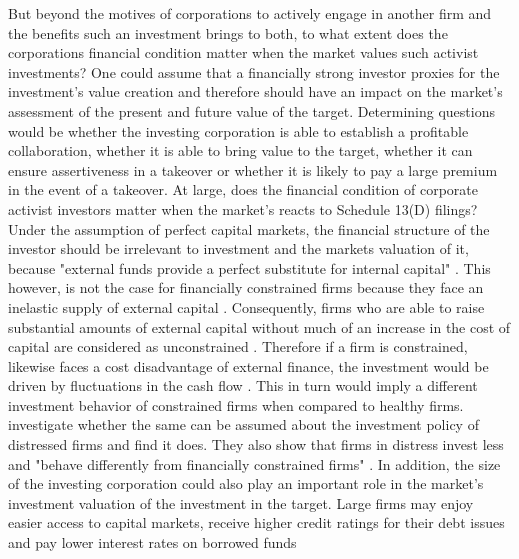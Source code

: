 \documentclass[12pt]{article}
\begin{document}
But beyond the motives of corporations to actively engage in another firm and the benefits such an investment brings to both, to what extent does the corporations financial condition matter when the market values such activist investments?  One could assume that a financially strong investor proxies for the investment's value creation and therefore should have an impact on the market's assessment of the present and future value of the target. Determining questions would be whether the investing corporation is able to establish a profitable collaboration, whether it is able to bring value to the target, whether it can ensure assertiveness in a takeover or whether it is likely to pay a large premium in the event of a takeover. At large, does the financial condition of corporate activist investors matter when the market's reacts to Schedule 13(D) filings?\\
Under the assumption of perfect capital markets, the financial structure of the investor should be irrelevant to investment and the markets valuation of it, because "external funds provide a perfect substitute for internal capital" \citep[p. 141]{Fazzari2016}. This however, is not the case for financially constrained firms because they face an inelastic supply of external capital \citep[p.1]{Farre-mensa2013}. Consequently, firms who are able to raise substantial amounts of external capital without much of an increase in the cost of capital are considered as unconstrained \citep[p.1]{Farre-mensa2013}. Therefore if a firm is constrained, likewise faces a cost disadvantage of external finance, the investment would be driven by fluctuations in the cash flow \citep[p. 142]{Fazzari1988} . This in turn would imply a different investment behavior of constrained firms when compared to healthy firms. \\
\citet[p.450]{Bhagat2005} investigate whether the same can be assumed about the investment policy of distressed firms and find it does. They also show that firms in distress invest less and "behave differently from financially constrained firms" \citep[p.461]{Bhagat2005}. 
In addition, the size of the investing corporation could also play an important role in the market's investment valuation of the investment in the target. Large firms may enjoy easier access to capital markets, receive higher credit ratings for their debt issues and pay lower interest rates on borrowed funds \citep{Saquido2003}
\end{document}

